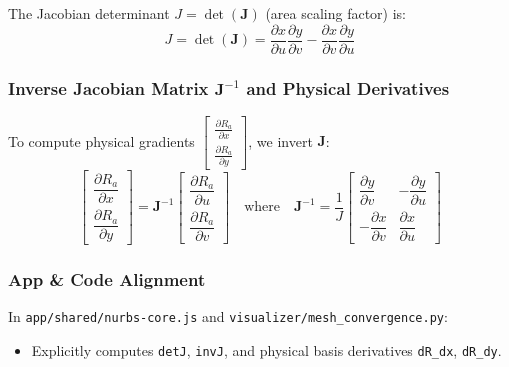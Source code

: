 The Jacobian determinant $J = \det(\mathbf{J})$ (area scaling factor) is:
\begin{equation}
J = \det(\mathbf{J}) = \frac{\partial x}{\partial u} \frac{\partial y}{\partial v} - \frac{\partial x}{\partial v} \frac{\partial y}{\partial u}
\end{equation}

\subsubsection{Inverse Jacobian Matrix $\mathbf{J}^{-1}$ and Physical Derivatives}
To compute physical gradients $\begin{bmatrix} \frac{\partial R_a}{\partial x} \\ \frac{\partial R_a}{\partial y} \end{bmatrix}$, we invert $\mathbf{J}$:
\begin{equation}
\begin{bmatrix} \dfrac{\partial R_a}{\partial x} \\[8pt] \dfrac{\partial R_a}{\partial y} \end{bmatrix} = \mathbf{J}^{-1} \begin{bmatrix} \dfrac{\partial R_a}{\partial u} \\[8pt] \dfrac{\partial R_a}{\partial v} \end{bmatrix}
\quad \text{where} \quad
\mathbf{J}^{-1} = \frac{1}{J} \begin{bmatrix} \dfrac{\partial y}{\partial v} & -\dfrac{\partial y}{\partial u} \\[8pt] -\dfrac{\partial x}{\partial v} & \dfrac{\partial x}{\partial u} \end{bmatrix}
\end{equation}

\subsubsection{App \& Code Alignment}
In \texttt{app/shared/nurbs-core.js} and \texttt{visualizer/mesh\_convergence.py}:
\begin{itemize}
    \item Explicitly computes \texttt{detJ}, \texttt{invJ}, and physical basis derivatives \texttt{dR\_dx}, \texttt{dR\_dy}.
\end{itemize}
